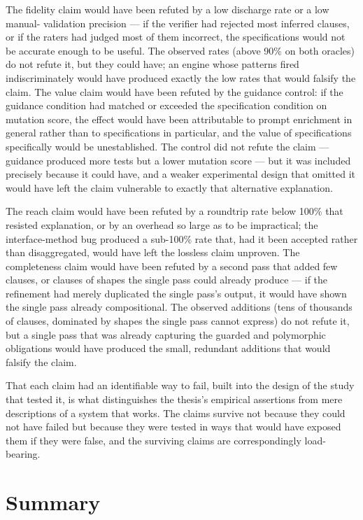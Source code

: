 The fidelity claim would have been refuted by a low discharge rate or a low manual-
validation precision --- if the verifier had rejected most inferred clauses, or if
the raters had judged most of them incorrect, the specifications would not be
accurate enough to be useful. The observed rates (above 90\% on both oracles) do not
refute it, but they could have; an engine whose patterns fired indiscriminately
would have produced exactly the low rates that would falsify the claim. The value
claim would have been refuted by the guidance control: if the guidance condition had
matched or exceeded the specification condition on mutation score, the effect would
have been attributable to prompt enrichment in general rather than to specifications
in particular, and the value of specifications specifically would be unestablished.
The control did not refute the claim --- guidance produced more tests but a lower
mutation score --- but it was included precisely because it could have, and a
weaker experimental design that omitted it would have left the claim vulnerable to
exactly that alternative explanation.

The reach claim would have been refuted by a roundtrip rate below 100\% that
resisted explanation, or by an overhead so large as to be impractical; the
interface-method bug produced a sub-100\% rate that, had it been accepted rather
than disaggregated, would have left the lossless claim unproven. The completeness
claim would have been refuted by a second pass that added few clauses, or clauses
of shapes the single pass could already produce --- if the refinement had merely
duplicated the single pass's output, it would have shown the single pass already
compositional. The observed additions (tens of thousands of clauses, dominated by
shapes the single pass cannot express) do not refute it, but a single pass that was
already capturing the guarded and polymorphic obligations would have produced the
small, redundant additions that would falsify the claim.

That each claim had an identifiable way to fail, built into the design of the study
that tested it, is what distinguishes the thesis's empirical assertions from mere
descriptions of a system that works. The claims survive not because they could not
have failed but because they were tested in ways that would have exposed them if
they were false, and the surviving claims are correspondingly load-bearing.

\section{Summary}

